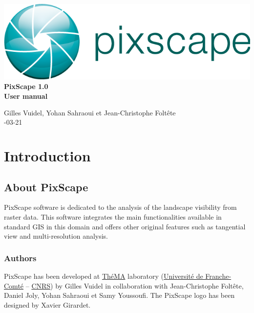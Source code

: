 \documentclass{report}
\begin{document}
 \begin{titlepage}
	
	\centering
	\includegraphics[scale=0.5]{img/logo.png}\\
	
	\bigskip
	\bigskip
	\bigskip	
	{\Huge
		\bfseries
		PixScape 1.0\\
		\bigskip
		User manual\\
	}
	\bigskip
	\bigskip
	\bigskip
	\bigskip
	\bigskip
	
	{\Large		
		Gilles Vuidel, Yohan Sahraoui et Jean-Christophe Foltête\\
		-03-21\\
	}
	
\end{titlepage}

\setcounter{tocdepth}{2}
\tableofcontents

\pagebreak

\chapter{Introduction}

\section{About PixScape}

PixScape software is dedicated to the analysis of the landscape visibility from raster data.
This software integrates the main functionalities available in standard GIS  in this domain and offers other original features such as tangential view and multi-resolution analysis.


\subsection{Authors}
PixScape has been developed at \href{http://thema.univ-fcomte.fr}{ThéMA} laboratory (\href{http://www.univ-fcomte.fr}{Université de Franche-Comté} – \href{http://www.cnrs.fr}{CNRS}) by Gilles Vuidel in collaboration with Jean-Christophe Foltête, Daniel Joly, Yohan Sahraoui et Samy Youssoufi. The PixScape logo has been designed by Xavier Girardet.
\end{document}
